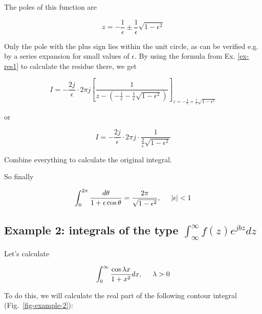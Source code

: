 The poles of this function are

\begin{equation}
z = - \frac{1}{\epsilon} \pm \frac{1}{\epsilon} \sqrt{1 - \epsilon^2}
\end{equation} 

Only the pole with the plus sign lies within the unit circle, as can be verified e.g. by a series expansion for small values of $\epsilon$. By using the formula from Ex. \ref{ex-res1} to calculate the residue there, we get

\begin{equation}
I = -\frac{2j}{\epsilon} \cdot 2 \pi j \left[\frac{1}{z - (-\frac{1}{\epsilon} -
\frac{1}{\epsilon} \sqrt{1 - \epsilon^2})}\right]_{z = - \frac{1}{\epsilon} +
\frac{1}{\epsilon} \sqrt{1 - \epsilon^2}}
\end{equation}

or

\begin{equation}
I = -\frac{2j}{\epsilon} \cdot 2 \pi j \cdot \frac{1}{\frac{2}{\epsilon} \sqrt{1
- \epsilon^2}}
\end{equation}

\begin{cue}
  Combine everything to calculate the original integral.
\end{cue}

So finally

\begin{equation}
\int_0^{2 \pi} \frac{d \theta}{1 + \epsilon \cos \theta} = \frac{2 \pi}{\sqrt{1
- \epsilon^2}}, \hspace{0.5cm} |\epsilon| < 1
\end{equation} 

\pagebreak
\subsection*{Example 2: integrals of the type $\int_\infty^{\infty} f(z) e^{jbz} dz$}

Let's calculate

\begin{equation}
\int_0^{\infty}\frac{\cos \lambda x}{1 + x^2} dx, \hspace{0.5cm} \lambda > 0
\end{equation}

\noindent{}To do this, we will calculate the real part of the following contour integral (Fig.~\ref{fig-example-2}):

